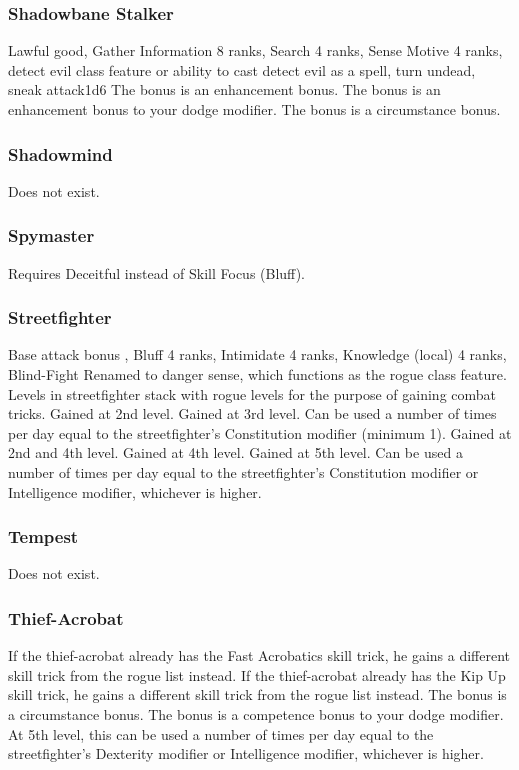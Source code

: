 \subsubsection{Shadowbane Stalker}
 Lawful good, Gather Information 8 ranks, Search 4 ranks, Sense Motive 4 ranks, detect evil class feature or ability to cast detect evil as a spell, turn undead, sneak attack\plus1d6
 The bonus is an enhancement bonus.
 The bonus is an enhancement bonus to your dodge modifier.
 The bonus is a circumstance bonus.
\subsubsection{Shadowmind}
Does not exist.
\subsubsection{Spymaster}
 Requires Deceitful instead of Skill Focus (Bluff).
\subsubsection{Streetfighter}
 Base attack bonus , Bluff 4 ranks, Intimidate 4 ranks, Knowledge (local) 4 ranks, Blind-Fight
 Renamed to danger sense, which functions as the rogue class feature.
 Levels in streetfighter stack with rogue levels for the purpose of gaining combat tricks.
 Gained at 2nd level.
 Gained at 3rd level. Can be used a number of times per day equal to the streetfighter's Constitution modifier (minimum 1).
 Gained at 2nd and 4th level.
 Gained at 4th level.
 Gained at 5th level. Can be used a number of times per day equal to the streetfighter's Constitution modifier or Intelligence modifier, whichever is higher.
\subsubsection{Tempest}
Does not exist.
\subsubsection{Thief-Acrobat}
 If the thief-acrobat already has the Fast Acrobatics skill trick, he gains a different skill trick from the rogue list instead.
 If the thief-acrobat already has the Kip Up skill trick, he gains a different skill trick from the rogue list instead.
 The bonus is a circumstance bonus.
 The bonus is a competence bonus to your dodge modifier.
 At 5th level, this can be used a number of times per day equal to the streetfighter's Dexterity modifier or Intelligence modifier, whichever is higher.
